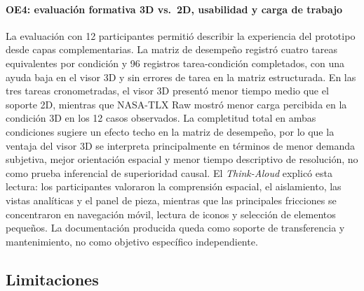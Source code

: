 \paragraph{OE4: evaluación formativa 3D vs.\ 2D, usabilidad y carga de trabajo} La evaluación con 12 participantes permitió describir la experiencia del prototipo desde capas complementarias. La matriz de desempeño registró cuatro tareas equivalentes por condición y 96 registros tarea-condición completados, con una ayuda baja en el visor 3D y sin errores de tarea en la matriz estructurada. En las tres tareas cronometradas, el visor 3D presentó menor tiempo medio que el soporte 2D, mientras que NASA-TLX Raw mostró menor carga percibida en la condición 3D en los 12 casos observados. La completitud total en ambas condiciones sugiere un efecto techo en la matriz de desempeño, por lo que la ventaja del visor 3D se interpreta principalmente en términos de menor demanda subjetiva, mejor orientación espacial y menor tiempo descriptivo de resolución, no como prueba inferencial de superioridad causal. El \textit{Think-Aloud} explicó esta lectura: los participantes valoraron la comprensión espacial, el aislamiento, las vistas analíticas y el panel de pieza, mientras que las principales fricciones se concentraron en navegación móvil, lectura de iconos y selección de elementos pequeños. La documentación producida queda como soporte de transferencia y mantenimiento, no como objetivo específico independiente.

\subsection{Limitaciones}

